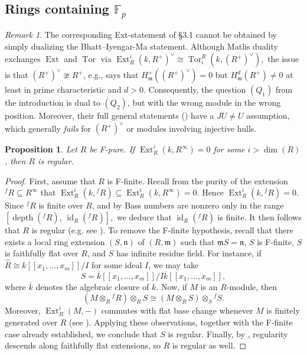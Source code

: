 \documentclass[12pt,reqno]{amsart}
\newtheorem{proposition}[theorem]{Proposition}
\theoremstyle{definition}
\theoremstyle{remark}
\newtheorem{remark}[theorem]{Remark}
\theoremstyle{cited}
\theoremstyle{remark}
\theoremstyle{citeddef}
\DeclareMathOperator{\Ext}{Ext}
\DeclareMathOperator{\depth}{depth}
\newcommand{\fm}{\mathfrak{m}}
\begin{document}
	
	
	
	\subsection{Rings containing \texorpdfstring{$\mathbb{F}_p$}{Fp}}
	
	\begin{remark}The corresponding Ext-statement of \S3.1 cannot be obtained by simply dualizing the Bhatt--Iyengar-Ma statement. Although Matlis duality exchanges \(\operatorname{Ext}\) and \(\operatorname{Tor}\) via
		\(
		\operatorname{Ext}_R^i(k, R^+)^\vee \cong \operatorname{Tor}_i^R(k, (R^+)^\vee),
		\)
		the issue is that \((R^+)^\vee \ncong R^+\), e.g., \cite[Corollary 4.12]{bhatt2019Regular} says that
		$H^+_{\fm}((R^+)^\vee)=0$ but  $H^d_{\fm}(R^+)\neq0$ at least in prime characteristic and $d>0$. Consequently, the question \((Q_1)\) from the introduction is dual to \((Q_2)\), but with the wrong module in the wrong position. Moreover, their full general statements (\cite[Theorem 2.1, Corollary 4.8]{bhatt2019Regular}) have a $JU \neq U$ assumption, which generally \emph{fails} for \((R^+)^\vee\) or modules involving injective hulls.\end{remark}
	
	
	\begin{proposition}\label{pur}
		Let \(R\) be F-pure. If 
		\(
		\operatorname{Ext}_R^i(k, R^\infty) = 0
		\)
		for some \(i > \dim(R)\), then \(R\) is regular.
	\end{proposition}
	
	\begin{proof}
		First, assume that \(R\) is F-finite. Recall from the purity of the extension \({}^f\!R \subseteq R^\infty\) that
		\(
		\operatorname{Ext}_R^i(k, {}^f\!R) \subseteq \operatorname{Ext}_R^i(k, R^\infty) = 0.
		\)
		Hence \(\operatorname{Ext}_R^i(k, {}^f\!R) = 0\). Since \({}^f\!R\) is finite over \(R\), and by \cite{Ro2} Bass numbers are nonzero only in the range 
		\(
		[\depth({}^f\!R), \, \operatorname{id}_R({}^f\!R)],
		\)
		we deduce that \(\operatorname{id}_R({}^f\!R)\) is finite. It then follows   that \(R\) is regular (e.g.  see \cite{AHIY}).
		To remove the F-finite hypothesis, recall that there exists a local ring extension \((S, \mathfrak{n})\) of \((R, \mathfrak{m})\) such that \(\mathfrak{m}S = \mathfrak{n}\), \(S\) is F-finite, \(S\) is faithfully flat over \(R\), and \(S\) has infinite residue field. For instance, if \(\widehat{R} \cong k[[x_1,\dots,x_m]]/I\) for some ideal \(I\), we may take 
		\[
		S = \overline{k}[[x_1,\dots,x_m]] / I\overline{k}[[x_1,\dots,x_m]],
		\]
		where \(\overline{k}\) denotes the algebraic closure of \(k\).
		Now, if \(M\) is an \(R\)-module, then
		\[
		(M \otimes_R {}^f\!R) \otimes_R S \cong (M \otimes_R S) \otimes_S {}^f\!S.
		\]
		Moreover, \(\Ext_R^i(M, -)\) commutes with flat base change whenever \(M\) is finitely generated over \(R\) (see \cite[Ex. 7.7]{mat}). Applying these observations, together with the F-finite case already established, we conclude that \(S\) is regular. Finally, by \cite[Theorem 2.2.12]{BH}, regularity descends along faithfully flat extensions, so \(R\) is regular as well.
	\end{proof}
	
\end{document}

